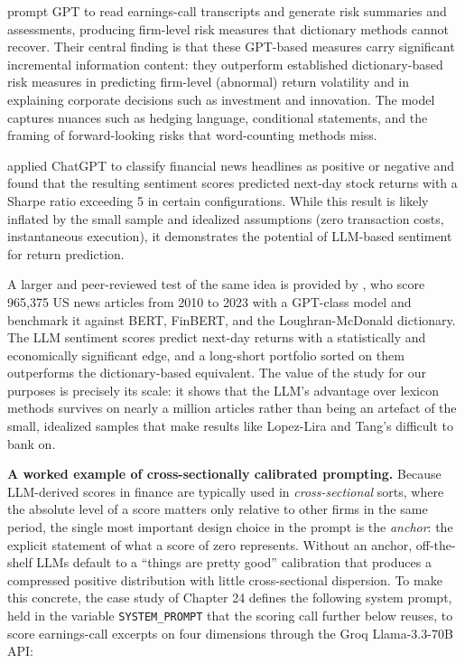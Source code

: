 \cite{kim2024transcripts} prompt GPT to read earnings-call transcripts and generate risk summaries and assessments, producing firm-level risk measures that dictionary methods cannot recover. Their central finding is that these GPT-based measures carry significant incremental information content: they outperform established dictionary-based risk measures in predicting firm-level (abnormal) return volatility and in explaining corporate decisions such as investment and innovation. The model captures nuances such as hedging language, conditional statements, and the framing of forward-looking risks that word-counting methods miss.

\cite{lopezlira2023chatgpt} applied ChatGPT to classify financial news headlines as positive or negative and found that the resulting sentiment scores predicted next-day stock returns with a Sharpe ratio exceeding 5 in certain configurations. While this result is likely inflated by the small sample and idealized assumptions (zero transaction costs, instantaneous execution), it demonstrates the potential of LLM-based sentiment for return prediction.

A larger and peer-reviewed test of the same idea is provided by \cite{kirtac2024sentiment}, who score 965,375 US news articles from 2010 to 2023 with a GPT-class model and benchmark it against BERT, FinBERT, and the Loughran-McDonald dictionary. The LLM sentiment scores predict next-day returns with a statistically and economically significant edge, and a long-short portfolio sorted on them outperforms the dictionary-based equivalent. The value of the study for our purposes is precisely its scale: it shows that the LLM's advantage over lexicon methods survives on nearly a million articles rather than being an artefact of the small, idealized samples that make results like Lopez-Lira and Tang's difficult to bank on.

\textbf{A worked example of cross-sectionally calibrated prompting.} Because LLM-derived scores in finance are typically used in \textit{cross-sectional} sorts, where the absolute level of a score matters only relative to other firms in the same period, the single most important design choice in the prompt is the \textit{anchor}: the explicit statement of what a score of zero represents. Without an anchor, off-the-shelf LLMs default to a ``things are pretty good'' calibration that produces a compressed positive distribution with little cross-sectional dispersion. To make this concrete, the case study of Chapter 24 defines the following system prompt, held in the variable \texttt{SYSTEM\_PROMPT} that the scoring call further below reuses, to score earnings-call excerpts on four dimensions through the Groq Llama-3.3-70B API:

